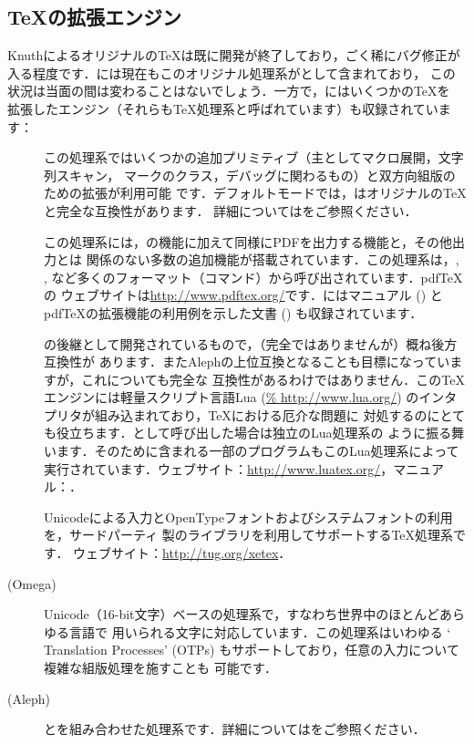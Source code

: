 \documentclass[uplatex,dvipdfmx]{jsarticle}
\begin{document}
\subsection{\TeX の拡張エンジン}
\label{sec:tex-extensions}

Knuthによるオリジナルの\TeX は既に開発が終了しており，ごく稀にバグ修正が
入る程度です．\TL には現在もこのオリジナル処理系がとして含まれており，
この状況は当面の間は変わることはないでしょう．一方で，\TL にはいくつかの\TeX を
拡張したエンジン（それらも\TeX 処理系と呼ばれています）も収録されています：
%
\begin{description}
\item[\eTeX]
この処理系ではいくつかの追加プリミティブ（主としてマクロ展開，文字列スキャン，
マークのクラス，デバッグに関わるもの）と双方向組版のための\TeXXeT 拡張が利用可能
です．デフォルトモードでは，\eTeX はオリジナルの\TeX と完全な互換性があります．
詳細についてはをご参照ください．

\item[\pdfTeX]
この処理系には，\eTeX の機能に加えて\DVI 同様にPDFを出力する機能と，その他出力とは
関係のない多数の追加機能が搭載されています．この処理系は，, ,
など多くのフォーマット（コマンド）から呼び出されています．pdf\TeX の
ウェブサイトは\url{http://www.pdftex.org/}です．\TL にはマニュアル () とpdf\TeX の拡張機能の利用例を示した文書 () も収録されています．

\item[\LuaTeX]
\pdfTeX の後継として開発されているもので，（完全ではありませんが）概ね後方互換性が
あります．またAlephの上位互換となることも目標になっていますが，これについても完全な
互換性があるわけではありません．この\TeX エンジンには軽量スクリプト言語Lua (\url{%
http://www.lua.org/}) のインタプリタが組み込まれており，\TeX における厄介な問題に
対処するのにとても役立ちます．として呼び出した場合は独立のLua処理系の
ように振る舞います．そのため\TL に含まれる一部のプログラムもこのLua処理系によって
実行されています．ウェブサイト：\url{http://www.luatex.org/}，マニュアル：．

\item[\XeTeX]
Unicodeによる入力とOpenTypeフォントおよびシステムフォントの利用を，サードパーティ
製のライブラリを利用してサポートする\TeX 処理系です．
ウェブサイト：\url{http://tug.org/xetex}．

\item[{\OMEGA} (Omega)]
Unicode（16-bit文字）ベースの処理系で，すなわち世界中のほとんどあらゆる言語で
用いられる文字に対応しています．この処理系はいわゆる `\OMEGA{} Translation
Processes' (OTPs) もサポートしており，任意の入力について複雑な組版処理を施すことも
可能です．

\item[{\ALEPH} (Aleph)]
\OMEGA と\eTeX を組み合わせた処理系です．詳細についてはをご参照ください．
\end{description}
\end{document}
